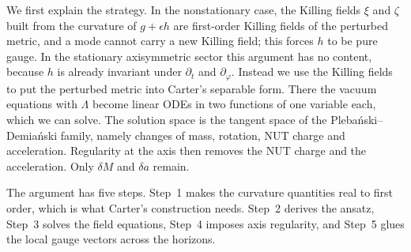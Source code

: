 \documentclass[11pt]{amsart}
\theoremstyle{definition}
\theoremstyle{remark}
\numberwithin{equation}{section}
\begin{document}
We first explain the strategy. In the nonstationary case, the Killing fields $\xi$ and $\zeta$ built from the
curvature of $g+\epsilon h$ are first-order Killing fields of the perturbed metric, and a mode cannot carry a new
Killing field; this forces $h$ to be pure gauge. In the stationary axisymmetric sector this argument has no content,
because $h$ is already invariant under $\partial_t$ and $\partial_\varphi$. Instead we use the Killing fields to put
the perturbed metric into Carter's separable form. There the vacuum equations with $\Lambda$ become linear ODEs in
two functions of one variable each, which we can solve. The solution space is the tangent space of the
Pleba\'nski--Demia\'nski family, namely changes of mass, rotation, NUT charge and acceleration. Regularity at the
axis then removes the NUT charge and the acceleration. Only $\delta M$ and $\delta a$ remain.

The argument has five steps. Step~1 makes the curvature quantities real to first order, which is what Carter's
construction needs. Step~2 derives the ansatz, Step~3 solves the field equations, Step~4 imposes axis regularity, and
Step~5 glues the local gauge vectors across the horizons.
\end{document}
